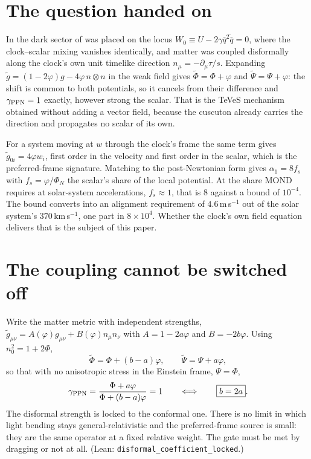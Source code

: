 \documentclass[11pt,letterpaper]{article}
\begin{document}
\section{The question handed on}
In \cite{paper24} the dark sector of \cite{paper13} was placed on the locus $W_0\equiv U-2\gamma\bar q^2\dot{\bar q}=0$, where the clock--scalar mixing vanishes identically, and matter was coupled disformally along the clock's own unit timelike direction $n_\mu=-\partial_\mu\tau/s$. Expanding $\tilde g=(1-2\varphi)g-4\varphi\,n\otimes n$ in the weak field gives $\tilde\Phi=\Phi+\varphi$ and $\tilde\Psi=\Psi+\varphi$: the shift is common to both potentials, so it cancels from their difference and $\gamma_{\rm PPN}=1$ exactly, however strong the scalar. That is the TeVeS mechanism \cite{teves} obtained without adding a vector field, because the cuscuton \cite{cuscuton} already carries the direction and propagates no scalar of its own.

For a system moving at $w$ through the clock's frame the same term gives $\tilde g_{0i}=4\varphi w_i$, first order in the velocity and first order in the scalar, which is the preferred-frame signature. Matching to the post-Newtonian form gives $\alpha_1=8f_s$ with $f_s=\varphi/\Phi_N$ the scalar's share of the local potential. At the share MOND requires at solar-system accelerations, $f_s\approx1$, that is $8$ against a bound of $10^{-4}$. The bound converts into an alignment requirement of $4.6\,$m$\,$s$^{-1}$ out of the solar system's $370\,$km$\,$s$^{-1}$, one part in $8\times10^4$. Whether the clock's own field equation delivers that is the subject of this paper.

\section{The coupling cannot be switched off}
Write the matter metric with independent strengths, $\tilde g_{\mu\nu}=A(\varphi)g_{\mu\nu}+B(\varphi)n_\mu n_\nu$ with $A=1-2a\varphi$ and $B=-2b\varphi$. Using $n_0^2=1+2\Phi$,
\begin{equation}
\tilde\Phi=\Phi+(b-a)\varphi,\qquad \tilde\Psi=\Psi+a\varphi ,
\end{equation}
so that with no anisotropic stress in the Einstein frame, $\Psi=\Phi$,
\begin{equation}
\gamma_{\rm PPN}=\frac{\Phi+a\varphi}{\Phi+(b-a)\varphi}=1\qquad\Longleftrightarrow\qquad \boxed{b=2a}.
\end{equation}
The disformal strength is locked to the conformal one. There is no limit in which light bending stays general-relativistic and the preferred-frame source is small: they are the same operator at a fixed relative weight. The gate must be met by dragging or not at all. (Lean: \texttt{disformal\_coefficient\_locked}.)
\end{document}

